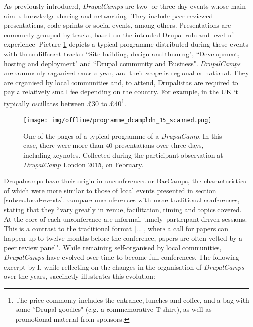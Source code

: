 As previously introduced, \textit{DrupalCamps} are two- or three-day events whose main aim is knowledge sharing and networking. They include peer-reviewed presentations, code sprints or social events, among others. Presentations are commonly grouped by tracks, based on the intended Drupal role and level of experience. Picture \ref{programme-dcamp-ldn} depicts a typical programme distributed during these events with three different tracks: ``Site building, design and theming", ``Development, hosting and deployment" and ``Drupal community and Business". \textit{DrupalCamps} are commonly organised once a year, and their scope is regional or national. They are organised by local communities and, to attend, Drupalistas are required to pay a relatively small fee depending on the country. For example, in the UK it typically oscillates between £30 to £40\footnote{The price commonly includes the entrance, lunches and coffee, and a bag with some ``Drupal goodies" (e.g. a commemorative T-shirt), as well as promotional material from sponsors.}.

\begin{figure}[H]
\centering
\texttt{[image: img/offline/programme\_dcampldn\_15\_scanned.png]}
\caption[Picture of the programme of \textit{DrupalCamp} London 2015]%
{One of the pages of a typical programme of a \textit{DrupalCamp}. In this case, there were more than 40 presentations over three days, including keynotes. Collected during the participant-observation at \textit{DrupalCamp} London 2015, on  February.}
\label{programme-dcamp-ldn}
\end{figure}

Drupalcamps have their origin in unconferences or BarCamps, the characteristics of which were more similar to those of local events presented in section \ref{subsec:local-events}. \textcite[9-10]{greenhill2008unconference} compare unconferences with more traditional conferences, stating that they ``vary greatly in venue, facilitation, timing and topics covered. At the core of each unconference are informal, timely, participant driven sessions. This is a contrast to the traditional format [...], where a call for papers can happen up to twelve months before the conference, papers are often vetted by a peer review panel". While remaining self-organised by local communities, \textit{DrupalCamps} have evolved over time to become full conferences. The following excerpt by I, while reflecting on the changes in the organisation of \textit{DrupalCamps} over the years, succinctly illustrates this evolution:

